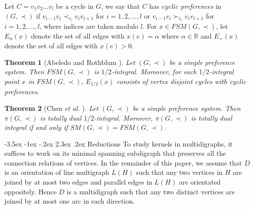 \documentclass[11pt]{article}
\makeatletter
\newtheorem{theorem}{Theorem}%
\numberwithin{theorem}{section}
\renewcommand\section{%
  \@startsection{section}{1}
                {\z@}%
                {-3.5ex \@plus -1ex \@minus -.2ex}%
                {2.3ex \@plus.2ex}%
                {\large\bfseries}%
}
\makeatother
\begin{document}
Let $C=v_1 v_2 \ldots v_l$ be a cycle in $G$, we say that $C$ has \textit{cyclic preferences} in $(G,\prec)$ if
$v_{i-1} v_i \prec_{v_i} v_i v_{i+1}$ for $i=1,2,\ldots,l$
or $v_{i-1} v_i\succ_{v_i} v_i v_{i+1}$ for $i=1,2,\ldots,l$,
where indices are taken modulo $l$.
For $x\in FSM(G,\prec)$, let $E_{\alpha}(x)$ denote the set of all edges with $x(e)=\alpha$ where $\alpha\in\mathbb{R}$ and $E_+(x)$ denote the set of all edges with $x(e)>0$.

\begin{theorem}[Abeledo and Rothblum \cite{AbelRoth94}]
\label{thm:AbelRoth94}
Let $(G,\prec)$ be a simple preference system. Then $FSM(G,\prec)$ is $1/2$-integral. Moreover, for each $1/2$-integral point $x$ in $FSM(G,\prec)$, $E_{1/2}(x)$ consists of vertex disjoint cycles with cyclic preferences.
\end{theorem} 

\begin{theorem}[Chen \textit{et al.} \cite{ChenDing12}]
\label{thm:ChenDing12}
Let $(G,\prec)$ be a simple preference system. Then $\pi(G,\prec)$ is totally dual $1/2$-integral. Moreover, $\pi(G,\prec)$ is totally dual integral if and only if $SM(G,\prec)=FSM(G,\prec)$.
\end{theorem}

\section{Reductions}
To study kernels in multidigraphs, it suffices to work on its minimal spanning subdigraph that  preserves all the connection relations of vertices. In the remainder of this paper, we assume that $D$ is an orientation of line multigraph $L(H)$ such that any two vertices in $H$ are joined by at most two edges and parallel edges in $L(H)$ are orientated oppositely. Hence $D$ is a multidigraph such that any two distinct vertices are joined by at most one arc in each direction.
\end{document}

